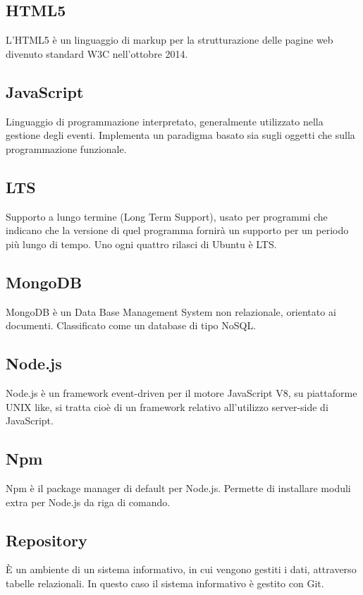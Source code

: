 \documentclass[a4paper, titlepage]{article}
\begin{document}
	\subsection{HTML5}
	L’HTML5 è un linguaggio di markup per la strutturazione delle pagine web divenuto standard W3C nell’ottobre 2014.
	
	\subsection{JavaScript}
	Linguaggio di programmazione interpretato, generalmente utilizzato nella gestione degli eventi.
	Implementa un paradigma basato sia sugli oggetti che sulla programmazione funzionale.
	
	\subsection{LTS}
	 Supporto a lungo termine (Long Term Support), usato per programmi che indicano che la versione di quel programma fornirà un supporto per un periodo più lungo di tempo. Uno ogni quattro rilasci di Ubuntu è LTS.
	
	\subsection{MongoDB}
	MongoDB è un Data Base Management System non relazionale, orientato ai documenti. Classificato come un database di tipo NoSQL.
	
	\subsection{Node.js}
	Node.js è un framework event-driven per il motore JavaScript V8, su piattaforme UNIX like, si tratta cioè di un framework relativo all'utilizzo server-side di JavaScript.
	
	\subsection{Npm}
	Npm è il package manager di default per Node.js. Permette di installare moduli extra per Node.js da riga di comando.
	
	\subsection{Repository}
	È un ambiente di un sistema informativo, in cui vengono gestiti i dati, attraverso tabelle relazionali. In questo caso il sistema informativo è gestito con Git.
	
\end{document}

